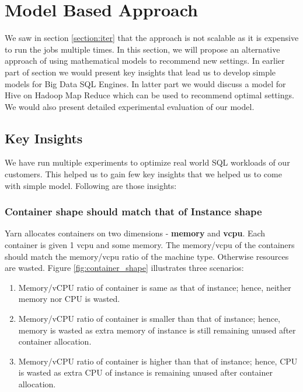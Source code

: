 \section{Model Based Approach}

We saw in section \ref{section:iter} that the approach is not scalable as it is expensive to run the jobs multiple times. In this section, we will propose an alternative approach of using mathematical models to recommend new settings. In earlier part of section we would present key insights that lead us to develop simple models for Big Data SQL Engines. In latter part we would discuss a model for Hive on Hadoop Map Reduce which can be used to recommend optimal settings. We would also present detailed experimental evaluation of our model.

\subsection{Key Insights}

We have run multiple experiments to optimize real world SQL workloads of our customers. This helped us to gain few key insights that we helped us to come with simple model. Following are those insights:

\noindent\subsubsection*{\bf Container shape should match that of Instance shape}
Yarn allocates containers on two dimensions - \textbf{memory} and \textbf{vcpu}. Each container is given 1 vcpu and some memory. The memory/vcpu of the containers should match the memory/vcpu ratio of the machine type. Otherwise resources are wasted. Figure \ref{fig:container_shape} illustrates three scenarios:
\begin{enumerate}[label=(\alph*)]
\item Memory/vCPU ratio of container is same as that of instance; hence, neither memory nor CPU is wasted. 
\item Memory/vCPU ratio of container is smaller than that of instance; hence, memory is wasted as extra memory of instance is still remaining unused after container allocation.
\item Memory/vCPU ratio of container is higher than that of instance; hence, CPU is wasted as extra CPU of instance is remaining unused after container allocation.
\end{enumerate}


